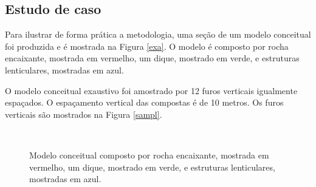 \subsection{Estudo de caso}

Para ilustrar de forma prática a metodologia, uma seção de um modelo conceitual foi produzida e é mostrada na Figura \autoref{exa}. O modelo é composto por rocha encaixante, mostrada em vermelho, um dique, mostrado em verde, e estruturas lenticulares, mostradas em azul.

O modelo conceitual exaustivo foi amostrado por 12 furos verticais igualmente espaçados. O espaçamento vertical das compostas é de 10 metros. Os furos verticais são mostrados na Figura \autoref{sampl}.

\begin{figure}[H]
    \centering
    \caption{Modelo conceitual composto por rocha encaixante, mostrada em vermelho, um dique, mostrado em verde, e estruturas lenticulares, mostradas em azul.} \label{concep_exhaust}
     \\
\end{figure}

